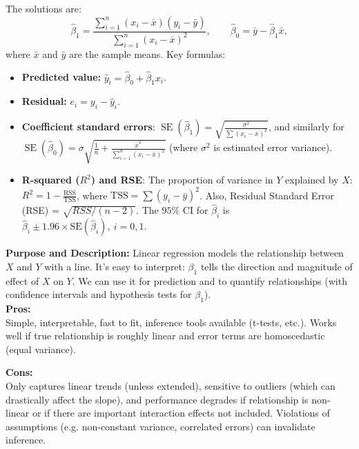 \documentclass[11pt]{article}
\begin{document}
The solutions are:
\[ \hat\beta_1 = \frac{\sum_{i=1}^n (x_i - \bar{x})(y_i - \bar{y})}{\sum_{i=1}^n (x_i - \bar{x})^2}, \qquad 
\hat\beta_0 = \bar{y} - \hat\beta_1 \bar{x}, \] 
where $\bar{x}$ and $\bar{y}$ are the sample means. Key formulas:
\begin{itemize}
  \item \textbf{Predicted value:} $\hat{y}_i = \hat\beta_0 + \hat\beta_1 x_i$.
  \item \textbf{Residual:} $e_i = y_i - \hat{y}_i$.
  \item \textbf{Coefficient standard errors}: 
  $\operatorname{SE}(\hat\beta_1) = \sqrt{\frac{\sigma^2}{\sum (x_i-\bar{x})^2}}$, 
  and similarly for $\operatorname{SE}(\hat\beta_0) = \sigma \sqrt{\frac{1}{n}+\frac{\bar{x}^2}{\sum_{i=1}^{n}{(x_i - \bar{x})^2}}}$ (where $\sigma^2$ is estimated error variance).
  \item \textbf{R-squared ($R^2$) and RSE}: The proportion of variance in $Y$ explained by $X$: 
  $R^2 = 1 - \frac{\text{RSS}}{\text{TSS}}$, where $\text{TSS} = \sum (y_i-\bar{y})^2$. Also, Residual Standard Error (RSE) = $\sqrt{RSS/(n-2)}$. The $95\%$ CI for $\hat\beta_i$ is $\hat\beta_i \pm 1.96 \times \text{SE}(\hat\beta_i), \: i=0,1$.
\end{itemize} \phantom{i}

\noindent \textbf{Purpose and Description:} Linear regression models the relationship between $X$ and $Y$ with a line. It's easy to interpret: $\beta_1$ tells the direction and magnitude of effect of $X$ on $Y$. We can use it for prediction and to quantify relationships (with confidence intervals and hypothesis tests for $\beta_1$). \\

\noindent \textbf{Pros:} \\
\noindent Simple, interpretable, fast to fit, inference tools available (t-tests, etc.). Works well if true relationship is roughly linear and error terms are homoscedastic (equal variance).

\noindent \textbf{Cons:} \\
\noindent Only captures linear trends (unless extended), sensitive to outliers (which can drastically affect the slope), and performance degrades if relationship is non-linear or if there are important interaction effects not included. Violations of assumptions (e.g. non-constant variance, correlated errors) can invalidate inference.
\end{document}

